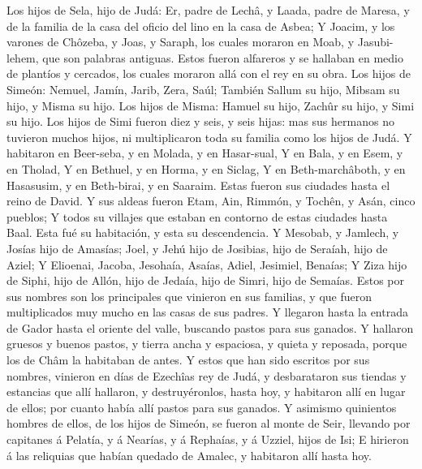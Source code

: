 Los hijos de Sela, hijo de Judá: Er, padre de Lechâ, y Laada, padre de
Maresa, y de la familia de la casa del oficio del lino en la casa de
Asbea;  Y Joacim, y los varones de Chôzeba, y Joas, y
Saraph, los cuales moraron en Moab, y Jasubi-lehem, que son palabras
antiguas.  Estos fueron alfareros y se hallaban en medio
de plantíos y cercados, los cuales moraron allá con el rey en su obra.
 Los hijos de Simeón: Nemuel, Jamín, Jarib, Zera, Saúl;
 También Sallum su hijo, Mibsam su hijo, y Misma su hijo.
 Los hijos de Misma: Hamuel su hijo, Zachûr su hijo, y
Simi su hijo.  Los hijos de Simi fueron diez y seis, y
seis hijas: mas sus hermanos no tuvieron muchos hijos, ni multiplicaron
toda su familia como los hijos de Judá.  Y habitaron en
Beer-seba, y en Molada, y en Hasar-sual,  Y en Bala, y en
Esem, y en Tholad,  Y en Bethuel, y en Horma, y en
Siclag,  Y en Beth-marchâboth, y en Hasasusim, y en
Beth-birai, y en Saaraim. Estas fueron sus ciudades hasta el reino de
David.  Y sus aldeas fueron Etam, Ain, Rimmón, y Tochên,
y Asán, cinco pueblos;  Y todos su villajes que estaban
en contorno de estas ciudades hasta Baal. Esta fué su habitación, y esta
su descendencia.  Y Mesobab, y Jamlech, y Josías hijo de
Amasías;  Joel, y Jehú hijo de Josibias, hijo de Seraíah,
hijo de Aziel;  Y Elioenai, Jacoba, Jesohaía, Asaías,
Adiel, Jesimiel, Benaías;  Y Ziza hijo de Siphi, hijo de
Allón, hijo de Jedaía, hijo de Simri, hijo de Semaías. 
Estos por sus nombres son los principales que vinieron en sus familias,
y que fueron multiplicados muy mucho en las casas de sus padres.
 Y llegaron hasta la entrada de Gador hasta el oriente
del valle, buscando pastos para sus ganados.  Y hallaron
gruesos y buenos pastos, y tierra ancha y espaciosa, y quieta y
reposada, porque los de Châm la habitaban de antes.  Y
estos que han sido escritos por sus nombres, vinieron en días de
Ezechîas rey de Judá, y desbarataron sus tiendas y estancias que allí
hallaron, y destruyéronlos, hasta hoy, y habitaron allí en lugar de
ellos; por cuanto había allí pastos para sus ganados.  Y
asimismo quinientos hombres de ellos, de los hijos de Simeón, se fueron
al monte de Seir, llevando por capitanes á Pelatía, y á Nearías, y á
Rephaías, y á Uzziel, hijos de Isi;  E hirieron á las
reliquias que habían quedado de Amalec, y habitaron allí hasta hoy.

